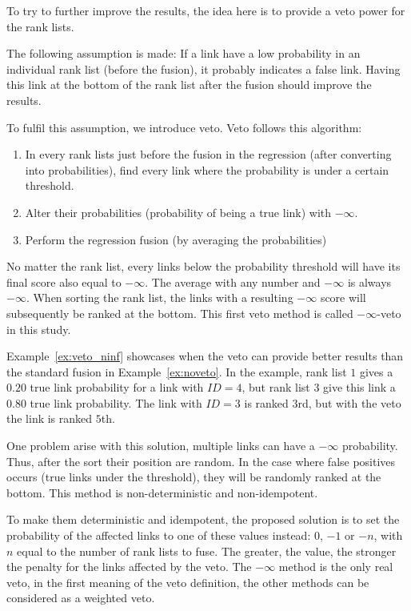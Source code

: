 To try to further improve the results, the idea here is to provide a veto power for the rank lists.

The following assumption is made:
If a link have a low probability in an individual rank list (before the fusion), it probably indicates a false link.
Having this link at the bottom of the rank list after the fusion should improve the results.

To fulfil this assumption, we introduce veto. Veto follows this algorithm:

\begin{enumerate}
  \item In every rank lists just before the fusion in the regression (after converting into probabilities), find every link where the probability is under a certain threshold.
  \item Alter their probabilities (probability of being a true link) with $-\infty$.
  \item Perform the regression fusion (by averaging the probabilities)
\end{enumerate}

No matter the rank list, every links below the probability threshold will have its final score also equal to $-\infty$.
The average with any number and $-\infty$ is always $-\infty$.
When sorting the rank list, the links with a resulting $-\infty$ score will subsequently be ranked at the bottom.
This first veto method is called $-\infty$-veto in this study.

Example~\ref{ex:veto_ninf} showcases when the veto can provide better results than the standard fusion in Example~\ref{ex:noveto}.
In the example, rank list $1$ gives a $0.20$ true link probability for a link with $ID = 4$, but rank list $3$ give this link a $0.80$ true link probability.
The link with $ID = 3$ is ranked $3$rd, but with the veto the link is ranked $5$th.

One problem arise with this solution, multiple links can have a $-\infty$ probability.
Thus, after the sort their position are random.
In the case where false positives occurs (true links under the threshold), they will be randomly ranked at the bottom.
This method is non-deterministic and non-idempotent.

To make them deterministic and idempotent, the proposed solution is to set the probability of the affected links to one of these values instead: $0$, $-1$ or $-n$, with $n$ equal to the number of rank lists to fuse.
The greater, the value, the stronger the penalty for the links affected by the veto.
The $-\infty$ method is the only real veto, in the first meaning of the veto definition, the other methods can be considered as a weighted veto.

